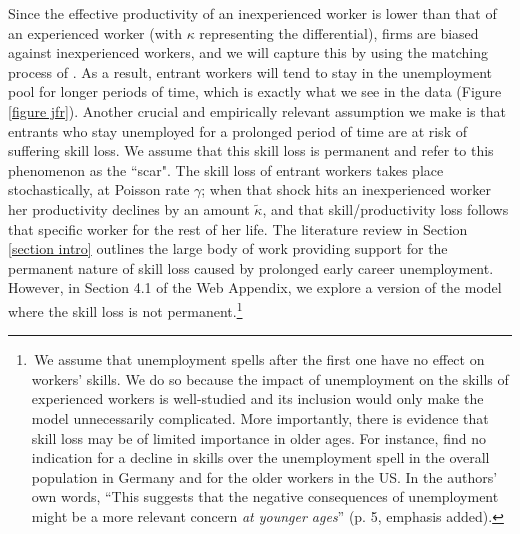 \documentclass[12pt]{article} %
\theoremstyle{definition}
\begin{document}
Since the effective productivity of an inexperienced worker is lower than that of an experienced worker (with $\kappa$ representing the differential), firms are biased against inexperienced workers, and we will capture this by using the matching process of \cite{petrongolo2001looking}. As a result, entrant workers will tend to stay in the unemployment pool for longer periods of time, which is exactly what we see in the data (Figure \ref{figure jfr}). Another crucial and empirically relevant assumption we make is that entrants who stay unemployed for a prolonged period of time are at risk of suffering skill loss. We assume that this skill loss is permanent and refer to this phenomenon as the ``scar". 
The skill loss of entrant workers takes place stochastically, at Poisson rate $\gamma$; when that shock hits an inexperienced worker her productivity declines by an amount $\tilde{\kappa}$, and that skill/productivity loss follows that specific worker for the rest of her life. 
The literature review in Section \ref{section intro} outlines the large body of work providing support for the permanent nature of skill loss caused by prolonged early career unemployment. However, in Section 4.1 of the Web Appendix, we explore a version of the model where the skill loss is not permanent.\footnote{\,We assume that unemployment spells after the first one have no effect on workers' skills. We do so because the impact of unemployment on the skills of experienced workers is well-studied and its inclusion would only make the model unnecessarily complicated.
More importantly, there is evidence that skill loss may be of limited importance in older ages. For instance, \cite{cohen2023skill} find no indication for a decline in skills over the unemployment spell in the overall population in Germany and for the older workers in the US. In the authors' own words, ``This suggests that the negative consequences of unemployment might be a more relevant concern \textit{at younger ages}'' (p. 5, emphasis added).} 
\end{document}
